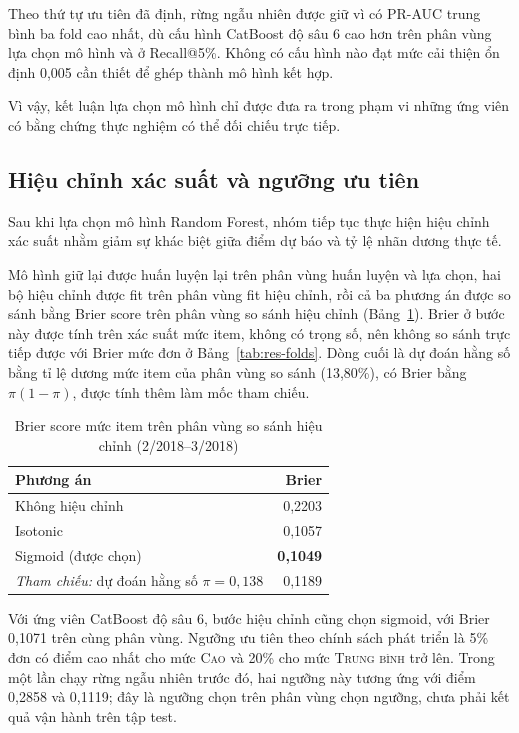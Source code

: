 \documentclass[12pt,a4paper]{report}
\begin{document}
Theo thứ tự ưu tiên đã định, rừng ngẫu nhiên được giữ vì có PR-AUC trung bình ba fold cao nhất, dù cấu hình CatBoost độ sâu 6 cao hơn trên phân vùng lựa chọn mô hình và ở Recall@5\%. Không có cấu hình nào đạt mức cải thiện ổn định 0,005 cần thiết để ghép thành mô hình kết hợp.

Vì vậy, kết luận lựa chọn mô hình chỉ được đưa ra trong phạm vi những ứng viên có bằng chứng thực nghiệm có thể đối chiếu trực tiếp.

\subsection{Hiệu chỉnh xác suất và ngưỡng ưu tiên}\label{subsec:tab-calibration}
Sau khi lựa chọn mô hình Random Forest, nhóm tiếp tục thực hiện hiệu chỉnh xác suất nhằm giảm sự khác biệt giữa điểm dự báo và tỷ lệ nhãn dương thực tế.

Mô hình giữ lại được huấn luyện lại trên phân vùng huấn luyện và lựa chọn, hai bộ hiệu chỉnh được fit trên phân vùng fit hiệu chỉnh, rồi cả ba phương án được so sánh bằng Brier score trên phân vùng so sánh hiệu chỉnh (Bảng~\ref{tab:res-calibration}). Brier ở bước này được tính trên xác suất mức item, không có trọng số, nên không so sánh trực tiếp được với Brier mức đơn ở Bảng~\ref{tab:res-folds}. Dòng cuối là dự đoán hằng số bằng tỉ lệ dương mức item của phân vùng so sánh (13,80\%), có Brier bằng $\pi(1-\pi)$, được tính thêm làm mốc tham chiếu.

\begin{table}[htbp]\centering\small
\caption{Brier score mức item trên phân vùng so sánh hiệu chỉnh (2/2018--3/2018)}\label{tab:res-calibration}
\begin{tabular}{lr}
\toprule
Phương án & Brier \\
\midrule
Không hiệu chỉnh & 0,2203 \\
Isotonic & 0,1057 \\
Sigmoid (được chọn) & \textbf{0,1049} \\
\midrule
\emph{Tham chiếu:} dự đoán hằng số $\pi = 0{,}138$ & 0,1189 \\
\bottomrule
\end{tabular}
\end{table}

Với ứng viên CatBoost độ sâu 6, bước hiệu chỉnh cũng chọn sigmoid, với Brier 0,1071 trên cùng phân vùng. Ngưỡng ưu tiên theo chính sách phát triển là 5\% đơn có điểm cao nhất cho mức \textsc{Cao} và 20\% cho mức \textsc{Trung bình} trở lên. Trong một lần chạy rừng ngẫu nhiên trước đó, hai ngưỡng này tương ứng với điểm 0,2858 và 0,1119; đây là ngưỡng chọn trên phân vùng chọn ngưỡng, chưa phải kết quả vận hành trên tập test.
\end{document}
